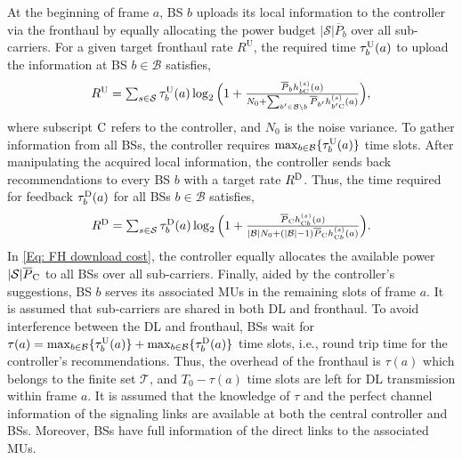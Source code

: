 \documentclass[conference]{IEEEtran}
\newcommand{\totalpower}[1]{%
	\overline{P}_{#1}%
}
\begin{document}
At the beginning of frame $a$, BS $b$ uploads its local information to the controller via the fronthaul by equally allocating the power budget $|\mathcal{S}|\totalpower{b}$ over all sub-carriers. For a given target  fronthaul rate $R^{\mathrm{U}}$,  the required time $\tau_{b}^{\rm U}(a)$ to upload the information at BS $b\in\mathcal{B}$ satisfies,
%
%
%
\begin{equation}\label{Eq: FH time cost}
\textstyle R^{\mathrm{U}}=  \sum_{s\in\mathcal{S}} \tau_{b}^{\rm U}(a)
\log_2\Big(1+\frac{\totalpower{b}h^{(s)}_{b{\rm C}}(a)}{N_0+\sum_{b'\in\mathcal{B}\setminus b}\totalpower{b'}h^{(s)}_{b'{\rm C}}(a)}\Big),
\end{equation}
%
%
%
where subscript ${\rm C}$ refers to the controller, and $N_0$ is the noise variance.
To gather information from all BSs, the controller requires $\max_{b\in\mathcal{B}}\{\tau_{b}^{\rm U}(a)\}$ time slots.
After manipulating the acquired local information, the controller sends back recommendations to every BS $b$ with a target rate  $R^{\rm D}$. Thus, the time required for feedback $\tau_{b}^{\rm D}(a)$ for all BSs $b\in\mathcal{B}$ satisfies,
%
%
%
\begin{equation}
%
\textstyle R^{\rm D}=\sum_{s\in\mathcal{S}} \tau_{b}^{\rm D}(a)
\log_2\Big(1+\frac{\totalpower  {\rm C} h^{(s)}_{{\rm C}b}(a)}{|\mathcal{B}|N_0+(|\mathcal{B}|-1)\totalpower {\rm C}h^{(s)}_{{\rm C}b}(a)}\Big).\label{Eq: FH download cost}
%
\end{equation}
%
%
%
In \eqref{Eq: FH download cost}, the controller equally allocates the available power $|\mathcal{S}|\totalpower {\rm C}$ to all BSs over all sub-carriers.
Finally, aided by the controller's suggestions, BS $b$ serves its associated MUs in the remaining slots of frame $a$. It is assumed that  sub-carriers are shared in both  DL and fronthaul. To avoid  interference between the DL and fronthaul, BSs wait for  $\tau(a)=\max_{b\in\mathcal{B}}\{\tau_{b}^{\rm U}(a)\}+\max_{b\in\mathcal{B}}\{\tau_{b}^{\rm D}(a)\}$ time slots, i.e., round trip time for the controller's recommendations. Thus, the overhead of the fronthaul is $\tau(a)$ which belongs to the finite set $\mathcal{T}$, and  $T_0-\tau(a)$ time slots are left for DL transmission within frame $a$.
It is assumed that the knowledge of $\tau$ and the perfect channel information of the signaling links are available at both the central controller and BSs. Moreover, BSs have full information of the direct links to the associated MUs.
\end{document}
